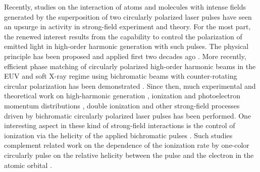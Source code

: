 Recently, studies on the interaction of atoms and molecules with intense fields generated by the superposition of two circularly polarized laser pulses have seen an upsurge in activity in strong-field experiment and theory. For the most part, the renewed interest results from the capability to control the polarization of emitted light in high-order harmonic generation with such pulses. The physical principle has been proposed and applied first two decades ago 
\cite{eichmann1995,long1995}. 
More recently, efficient phase matching of circularly polarized high-order harmonic beams in the EUV and soft X-ray regime using bichromatic beams with counter-rotating circular polarization has been demonstrated \cite{fleischer2014,pisanty2014,kfir2015,fan2015,hickstein2015}. Since then, much experimental and theoretical work on high-harmonic generation \cite{milosevic2015a,medisauskas2015,milosevic2015b,chen2016,baykusheva2016,hernandez2016,liu2016,mauger2016,bandrauk2016,reich2016b,odzak2016,dorney2017,fleischer2017,zhavoronkov2017,pisanty2017,baykusheva2017,lerner2017,ayuso2018,dixit2018,barreau2018,huang2018,jimenez2018,heslar2018,paufler2018,li2019}, 
ionization and photoelectron momentum distributions
\cite{ngoko2015,yuan2016,milosevic2016c,mancuso2016,milosevic2016b,mancuso2017,pengel2017,busuladzic2017,hoang2017,lin2017,abusamha2018,busuladzic2018,eckart2018,li2018,han2018,eckart2018b,liu2018,eicke2019,ge2019,kerbstadt2019,abusamha2019}, double ionization 
\cite{mancuso2016b,eckart2016,ben2017,ngoko2017,yu2018,huang2018b,ma2019}
and other strong-field processes \cite{yuan2015,buica2018,guo2019} driven by bichromatic circularly polarized laser pulses has been performed. One interesting aspect in these kind of strong-field interactions is the control of ionization via the helicity of the applied bichromatic pulses \cite{milosevic2016c,mancuso2016,liu2018}. Such studies complement related work on the dependence of the ionization rate by one-color circularly pulse on the relative helicity between the pulse and the electron in the atomic orbital
\cite{barth2011,kazansky2012,herath2012,barth2013,bauer2014,barth2014,ooi2014,hartung2016,douguet2016,watzel2016,wang2017,zhang2017,eckart2018c,liu2018b,trabert2018}.

